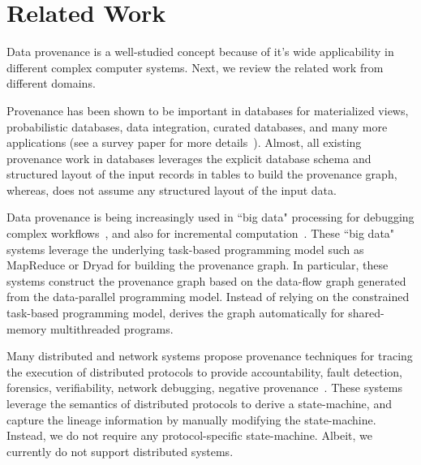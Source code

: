 \section{Related Work}
\label{sec:related}







Data provenance is a well-studied concept because of it's wide applicability in different complex computer systems. Next, we review the related work from different domains.






 Provenance has been shown to be important in databases for materialized views, probabilistic databases, data integration, curated databases, and many more applications (see a survey paper for more details~\cite{provenance-database-tutorial}). Almost, all existing provenance work in databases leverages the explicit database schema and structured layout of the input records in tables to build the provenance graph, whereas, \projecttitle does not assume any structured layout of the input data.

 
 Data provenance is being increasingly used in ``big data"  processing for  debugging complex workflows~\cite{nova}, and also for incremental computation~\cite{incoop}.  These ``big data" systems leverage the underlying task-based programming model such as MapReduce or Dryad %
for building the provenance graph. 
In particular, these systems construct the provenance graph based on the data-flow graph generated from the data-parallel programming model. 
Instead of relying on the constrained task-based programming model,  \projecttitle derives the graph automatically for shared-memory multithreaded programs.


 Many distributed and network systems propose provenance techniques for tracing the  execution of distributed protocols to provide accountability, fault detection, forensics, verifiability, network debugging, negative provenance~\cite{ wu-2014-negative-provenance, snp, dtap}. %
These systems leverage the semantics of distributed protocols to derive a state-machine, and capture the lineage information by manually modifying the state-machine. Instead, we do not require any protocol-specific state-machine. Albeit, we currently do not support distributed systems.

